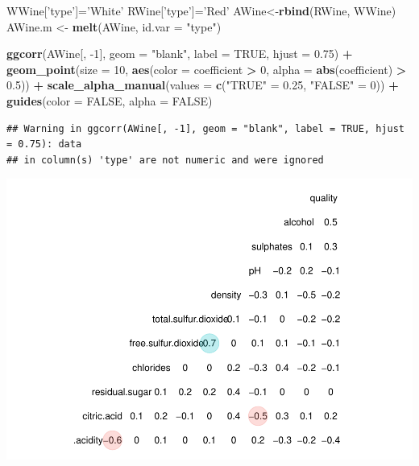 \documentclass[]{article}
\newenvironment{Shaded}{\begin{snugshade}}{\end{snugshade}}
\newcommand{\DataTypeTok}[1]{\textcolor[rgb]{0.13,0.29,0.53}{#1}}
\newcommand{\DecValTok}[1]{\textcolor[rgb]{0.00,0.00,0.81}{#1}}
\newcommand{\FloatTok}[1]{\textcolor[rgb]{0.00,0.00,0.81}{#1}}
\newcommand{\KeywordTok}[1]{\textcolor[rgb]{0.13,0.29,0.53}{\textbf{#1}}}
\newcommand{\NormalTok}[1]{#1}
\newcommand{\OperatorTok}[1]{\textcolor[rgb]{0.81,0.36,0.00}{\textbf{#1}}}
\newcommand{\OtherTok}[1]{\textcolor[rgb]{0.56,0.35,0.01}{#1}}
\newcommand{\StringTok}[1]{\textcolor[rgb]{0.31,0.60,0.02}{#1}}
\begin{document}
\begin{Shaded}
\begin{Highlighting}[]
\NormalTok{WWine[}\StringTok{'type'}\NormalTok{]=}\StringTok{'White'}
\NormalTok{RWine[}\StringTok{'type'}\NormalTok{]=}\StringTok{'Red'}
\NormalTok{AWine<-}\KeywordTok{rbind}\NormalTok{(RWine, WWine)}
\NormalTok{AWine.m <-}\StringTok{ }\KeywordTok{melt}\NormalTok{(AWine, }\DataTypeTok{id.var =} \StringTok{"type"}\NormalTok{)}

\KeywordTok{ggcorr}\NormalTok{(AWine[, }\DecValTok{-1}\NormalTok{], }\DataTypeTok{geom =} \StringTok{"blank"}\NormalTok{, }\DataTypeTok{label =} \OtherTok{TRUE}\NormalTok{, }\DataTypeTok{hjust =} \FloatTok{0.75}\NormalTok{) }\OperatorTok{+}
\StringTok{  }\KeywordTok{geom_point}\NormalTok{(}\DataTypeTok{size =} \DecValTok{10}\NormalTok{, }\KeywordTok{aes}\NormalTok{(}\DataTypeTok{color =}\NormalTok{ coefficient }\OperatorTok{>}\StringTok{ }\DecValTok{0}\NormalTok{, }\DataTypeTok{alpha =} \KeywordTok{abs}\NormalTok{(coefficient) }\OperatorTok{>}\StringTok{ }\FloatTok{0.5}\NormalTok{)) }\OperatorTok{+}
\StringTok{  }\KeywordTok{scale_alpha_manual}\NormalTok{(}\DataTypeTok{values =} \KeywordTok{c}\NormalTok{(}\StringTok{"TRUE"}\NormalTok{ =}\StringTok{ }\FloatTok{0.25}\NormalTok{, }\StringTok{"FALSE"}\NormalTok{ =}\StringTok{ }\DecValTok{0}\NormalTok{)) }\OperatorTok{+}
\StringTok{  }\KeywordTok{guides}\NormalTok{(}\DataTypeTok{color =} \OtherTok{FALSE}\NormalTok{, }\DataTypeTok{alpha =} \OtherTok{FALSE}\NormalTok{)}
\end{Highlighting}
\end{Shaded}

\begin{verbatim}
## Warning in ggcorr(AWine[, -1], geom = "blank", label = TRUE, hjust = 0.75): data
## in column(s) 'type' are not numeric and were ignored
\end{verbatim}

\includegraphics{repport_files/figure-latex/unnamed-chunk-2-1.pdf}
\end{document}
